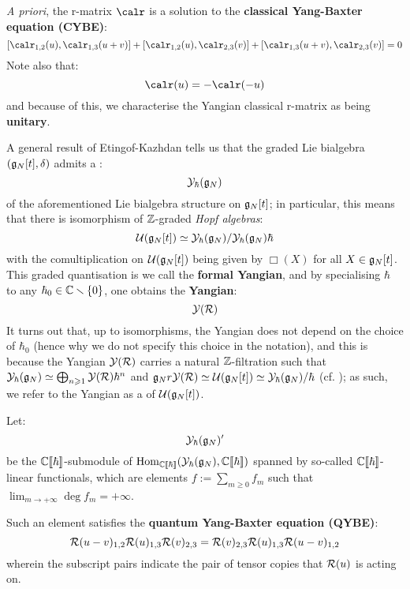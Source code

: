         \textit{A priori}, the r-matrix $\calr$ is a solution to the \textbf{classical Yang-Baxter equation (CYBE)}:
            \begin{equation} \label{equation: spectral_CYBE}
                [\calr_{1, 2}(u), \calr_{1, 3}(u + v)] + [\calr_{1, 2}(u), \calr_{2, 3}(v)] + [\calr_{1, 3}(u + v), \calr_{2, 3}(v)] = 0
            \end{equation}
        Note also that:
            \begin{equation} \label{equation: spectral_classical_unitarity}
                \calr(u) = -\calr(-u)
            \end{equation}
        and because of this, we characterise the Yangian classical r-matrix as being \textbf{unitary}.
        
        A general result of Etingof-Kazhdan tells us that the graded Lie bialgebra $(\mathfrak{g}_N[t], \delta)$ admits a :
            $$\mathcal{Y}_{\hbar}(\mathfrak{g}_N)$$
        of the aforementioned Lie bialgebra structure on $\mathfrak{g}_N[t]$; in particular, this means that there is isomorphism of $\mathbb{Z}$-graded \textit{Hopf algebras}:
            $$\mathcal{U}(\mathfrak{g}_N[t]) \simeq \mathcal{Y}_{\hbar}(\mathfrak{g}_N)/\mathcal{Y}_{\hbar}(\mathfrak{g}_N) \hbar$$
        with the comultiplication on $\mathcal{U}(\mathfrak{g}_N[t])$ being given by $\Box(X)$ for all $X \in \mathfrak{g}_N[t]$. This graded quantisation is we call the \textbf{formal Yangian}, and by specialising $\hbar$ to any $\hbar_0 \in \mathbb{C} \smallsetminus \{0\}$, one obtains the \textbf{Yangian}:
            $$\mathcal{Y}(\mathcal{R})$$
        It turns out that, up to isomorphisms, the Yangian does not depend on the choice of $\hbar_0$ (hence why we do not specify this choice in the notation), and this is because the Yangian $\mathcal{Y}(\mathcal{R})$ carries a natural $\mathbb{Z}$-filtration such that $\mathcal{Y}_{\hbar}(\mathfrak{g}_N) \simeq \bigoplus_{n \geqslant 1} \mathcal{Y}(\mathcal{R}) \hbar^n$ and $\mathfrak{g}_Nr \mathcal{Y}(\mathcal{R}) \simeq \mathcal{U}(\mathfrak{g}_N[t]) \simeq \mathcal{Y}_{\hbar}(\mathfrak{g}_N)/\hbar$ (cf. \cite{drinfeld_original_yangian_paper}); as such, we refer to the Yangian as a  of $\mathcal{U}(\mathfrak{g}_N[t])$.
    
        Let:
            $$\mathcal{Y}_{\hbar}(\mathfrak{g}_N)'$$
        be the $\mathbb{C}[\![\hbar]\!]$-submodule of $\operatorname{Hom}_{\mathbb{C}[\![\hbar]\!]}( \mathcal{Y}_{\hbar}(\mathfrak{g}_N), \mathbb{C}[\![\hbar]\!] )$ spanned by so-called  $\mathbb{C}[\![\hbar]\!]$-linear functionals, which are elements $f := \sum_{m \geq 0} f_m$ such that $\lim_{m \to +\infty} \deg f_m = +\infty$.
            
        Such an element satisfies the \textbf{quantum Yang-Baxter equation (QYBE)}:
            \begin{equation} \label{equation: additive_spectral_QYBE}
                \mathcal{R}(u - v)_{1, 2} \mathcal{R}(u)_{1, 3} \mathcal{R}(v)_{2, 3} = \mathcal{R}(v)_{2, 3} \mathcal{R}(u)_{1, 3} \mathcal{R}(u - v)_{1, 2}
            \end{equation}
        wherein the subscript pairs indicate the pair of tensor copies that $\mathcal{R}(u)$ is acting on.
    
